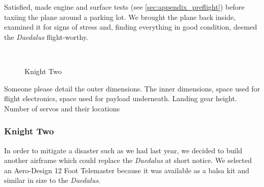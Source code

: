 \documentclass[10pt]{report}
\begin{document}
Satisfied, made engine and surface tests (see \ref{sec:appendix_preflight}) before taxiing the plane around a parking lot.  We brought the plane back inside, examined it for signs of stress and, finding everything in good condition, deemed the \emph{Daedalus} flight-worthy.

\begin{figure}
	\centering
\\
  	\label{fig:knighttwo}
  	\caption[Knight Two]{Knight Two}

\end{figure}
Someone please detail the outer dimensions. The inner dimensions, space used for flight electronics, space used for payload underneath. Landing gear height. Number of servos and their locations

\subsubsection{Knight Two}

In order to mitigate a disaster such as we had last year, we decided to build another airframe which could replace the \emph{Daedalus} at short notice. We selected an Aero-Design 12 Foot Telemaster \cite{aerodesign} because it was available as a balsa kit and similar in size to the \emph{Daedalus}.
\end{document}

